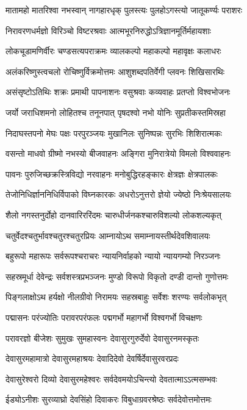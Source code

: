 \twolineshloka
{मातामहो मातरिश्वा नभस्वान् नागहारधृक्}
{पुलस्त्यः पुलहोऽगस्त्यो जातूकर्ण्यः पराशरः}

\twolineshloka
{निरावरणधर्मज्ञो विरिञ्चो विष्टरश्रवाः}
{आत्मभूरनिरुद्धोऽत्रिज्ञानमूर्तिर्महायशाः}

\twolineshloka
{लोकचूडामणिर्वीरः चण्डसत्यपराक्रमः}
{व्यालकल्पो महाकल्पो महावृक्षः कलाधरः}

\twolineshloka
{अलंकरिष्णुस्त्वचलो रोचिष्णुर्विक्रमोत्तमः}
{आशुशब्दपतिर्वेगी प्लवनः शिखिसारथिः}

\twolineshloka
{असंसृष्टोऽतिथिः शक्रः प्रमाथी पापनाशनः}
{वसुश्रवाः कव्यवाहः प्रतप्तो विश्वभोजनः}

\twolineshloka
{जर्यो जराधिशमनो लोहितश्च तनूनपात्}
{पृषदश्वो नभो योनिः सुप्रतीकस्तमिस्रहा}

\twolineshloka
{निदाघस्तपनो मेघः पक्षः परपुरञ्जयः}
{मुखानिलः सुनिष्पन्नः सुरभिः शिशिरात्मकः}

\twolineshloka
{वसन्तो माधवो ग्रीष्मो नभस्यो बीजवाहनः}
{अङ्गिरा मुनिरात्रेयो विमलो विश्ववाहनः}

\twolineshloka
{पावनः पुरुजिच्छक्रस्त्रिविद्यो नरवाहनः}
{मनोबुद्धिरहङ्कारः क्षेत्रज्ञः क्षेत्रपालकः}

\twolineshloka
{तेजोनिधिर्ज्ञाननिधिर्विपाको विघ्नकारकः}
{अधरोऽनुत्तरो ज्ञेयो ज्येष्ठो निःश्रेयसालयः}

\twolineshloka
{शैलो नगस्तनुर्दोहो दानवारिररिंदमः}
{चारुधीर्जनकश्चारुविशल्यो लोकशल्यकृत्}

\twolineshloka
{चतुर्वेदश्चतुर्भावश्चतुरश्चतुरप्रियः}
{आम्नायोऽथ समाम्नायस्तीर्थदेवशिवालयः}

\twolineshloka
{बहुरूपो महारूपः सर्वरूपश्चराचरः}
{न्यायनिर्वाहको न्यायो न्यायगम्यो निरञ्जनः}

\twolineshloka
{सहस्रमूर्धा देवेन्द्रः सर्वशस्त्रप्रभञ्जनः}
{मुण्डो विरूपो विकृतो दण्डी दान्तो गुणोत्तमः}

\twolineshloka
{पिङ्गलाक्षोऽथ हर्यक्षो नीलग्रीवो निरामयः}
{सहस्रबाहुः सर्वेशः शरण्यः सर्वलोकभृत्}

\twolineshloka
{पद्मासनः परंज्योतिः परावरपरंफलः}
{पद्मगर्भो महागर्भो विश्वगर्भो विचक्षणः}

\twolineshloka
{परावरज्ञो बीजेशः सुमुखः सुमहास्वनः}
{देवासुरगुरुर्देवो देवासुरनमस्कृतः}

\twolineshloka
{देवासुरमहामात्रो देवासुरमहाश्रयः}
{देवादिदेवो देवर्षिर्देवासुरवरप्रदः}

\twolineshloka
{देवासुरेश्वरो दिव्यो देवासुरमहेश्वरः}
{सर्वदेवमयोऽचिन्त्यो देवतात्माऽऽत्मसम्भवः}

\twolineshloka
{ईड्योऽनीशः सुरव्याघ्रो देवसिंहो दिवाकरः}
{विबुधाग्रवरश्रेष्ठः सर्वदेवोत्तमोत्तमः}

